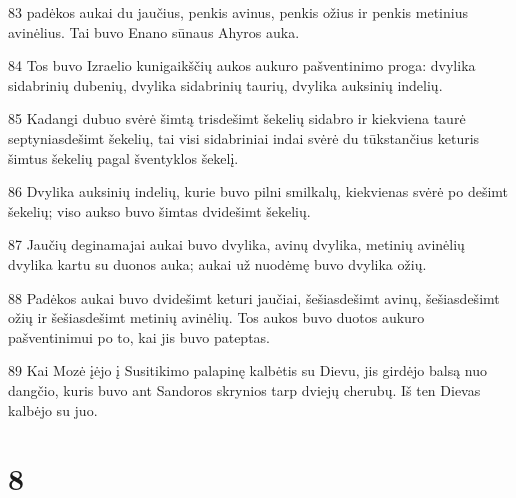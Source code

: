 \par 83 padėkos aukai du jaučius, penkis avinus, penkis ožius ir penkis metinius avinėlius. Tai buvo Enano sūnaus Ahyros auka. 
\par 84 Tos buvo Izraelio kunigaikščių aukos aukuro pašventinimo proga: dvylika sidabrinių dubenių, dvylika sidabrinių taurių, dvylika auksinių indelių. 
\par 85 Kadangi dubuo svėrė šimtą trisdešimt šekelių sidabro ir kiekviena taurė septyniasdešimt šekelių, tai visi sidabriniai indai svėrė du tūkstančius keturis šimtus šekelių pagal šventyklos šekelį. 
\par 86 Dvylika auksinių indelių, kurie buvo pilni smilkalų, kiekvienas svėrė po dešimt šekelių; viso aukso buvo šimtas dvidešimt šekelių. 
\par 87 Jaučių deginamajai aukai buvo dvylika, avinų dvylika, metinių avinėlių dvylika kartu su duonos auka; aukai už nuodėmę buvo dvylika ožių. 
\par 88 Padėkos aukai buvo dvidešimt keturi jaučiai, šešiasdešimt avinų, šešiasdešimt ožių ir šešiasdešimt metinių avinėlių. Tos aukos buvo duotos aukuro pašventinimui po to, kai jis buvo pateptas. 
\par 89 Kai Mozė įėjo į Susitikimo palapinę kalbėtis su Dievu, jis girdėjo balsą nuo dangčio, kuris buvo ant Sandoros skrynios tarp dviejų cherubų. Iš ten Dievas kalbėjo su juo.



\chapter{8}



